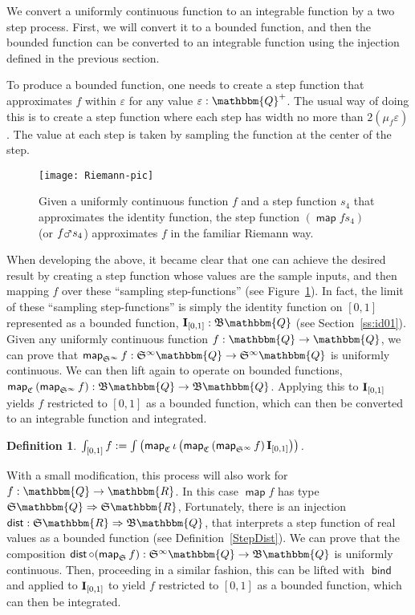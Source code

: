 \documentclass{elsarticle}
\newcommand{\assign}{:=}
\newcommand{\tmop}[1]{\ensuremath{\operatorname{#1}}}
\newcommand{\tmstrong}[1]{\textbf{#1}}
\newcommand{\tmtextup}[1]{{\upshape{#1}}}
\newtheorem{definition}{Definition}
\newcommand{\arr}{\ensuremath{\rightarrow}}
\newcommand{\C}{\ensuremath{\mathfrak{C}}}
\newcommand{\uc}{uniformly continuous}
\newcommand{\Map}{\ensuremath{\mars}}
\newcommand{\fastMap}{\ensuremath{\tmop{\mathsf{map}}}}
\newcommand{\fastBind}{\ensuremath{\tmop{\mathsf{bind}}}}
\newcommand{\SF}{\ensuremath{\mathfrak{S}}}
\newcommand{\BF}{\ensuremath{\mathfrak{B}}}
\newcommand{\id}{\text{{\tmstrong{\tmtextup{I}}}}}
\newcommand{\idzeroone}{\ensuremath{\id_{[0, 1]}}}
\begin{document}
We convert a {\uc} function to an integrable function by a two step process.
First, we will convert it to a bounded function, and then the bounded function
can be converted to an integrable function using the injection defined in the
previous section.

To produce a bounded function, one needs to create a step function that
approximates $f$ within $\varepsilon$ for any value $\varepsilon :
\mathbbm{Q}^+$. The usual way of doing this is to create a step function where
each step has width no more than $2 \left( \mu_f \varepsilon \right)$. The
value at each step is taken by sampling the function at the center of the
step.
\begin{figure}[h]\label{fig:Riemann}
  \hspace*{-2.5cm}\texttt{[image: Riemann-pic]}\vspace*{-17mm}
  \caption{Given a uniformly continuous function $f$ and a step function $s_4$
  that approximates the identity function, the step function $(
  \tmop{\mathsf{map}} f s_4)$ (or $f \Map s_4$) approximates $f$ in the
  familiar Riemann way.}
\end{figure}

When developing the above, it became clear that one can
achieve the desired result by creating a step function whose values are the
sample inputs, and then mapping $f$ over these ``sampling step-functions''
(see Figure~\ref{fig:Riemann}). In fact, the limit of these
``sampling step-functions'' is simply the identity function on $[0,1]$
represented as a bounded function, $\idzeroone: \BF \mathbbm{Q}$ (see
Section~\ref{ss:id01}). Given any {\uc} function $f: \mathbbm{Q} \arr
\mathbbm{Q}$, we can prove that $\tmop{\mathsf{map}}_{\SF^{\infty}} f :
\SF^{\infty} \mathbbm{Q} \arr \SF^{\infty} \mathbbm{Q}$ is {\uc}. We can then
lift again to operate on bounded functions, $\fastMap_{\C} \left(
\tmop{\mathsf{map}}_{\SF^{\infty}} f \right) : \BF \mathbbm{Q} \arr \BF
\mathbbm{Q}$. Applying this to {\idzeroone} yields $f$ restricted to $[0,1]$
as a bounded function, which can then be converted to an integrable function
and integrated.

\begin{definition}
  $\int_{[0,1]} f \assign \int \left( \fastMap_{\C} \iota
  \left( \fastMap_{\C} \left( \tmop{\mathsf{map}}_{\SF^{\infty}} f \right)
  \idzeroone \right) \right)$.
\end{definition}

With a small modification, this process will also work for $f : \mathbbm{Q}
\arr \mathbbm{R}$. In this case $\tmop{\mathsf{map}} f$ has type $\SF
\mathbbm{Q} \Rightarrow \SF \mathbbm{R}$, Fortunately, there is an injection
$\tmop{\mathsf{dist}} : \SF \mathbbm{R} \Rightarrow \BF \mathbbm{Q}$, that
interprets a step function of real values as a bounded function (see
Definition~\ref{StepDist}). We can prove that the composition
$\tmop{\mathsf{dist}} \circ ( \tmop{\mathsf{map}}_{\SF} f) : \SF^{\infty}
\mathbbm{Q} \arr \BF \mathbbm{Q}$ is {\uc}. Then, proceeding in a similar
fashion, this can be lifted with {\fastBind} and applied to {\idzeroone} to
yield $f$ restricted to $[0,1]$ as a bounded function, which can then be
integrated.
\end{document}
